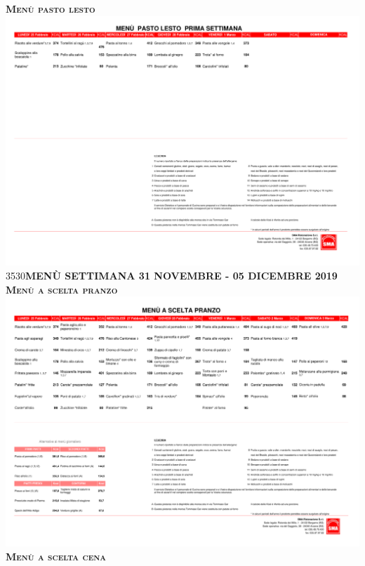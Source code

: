 \documentclass{article}
\makeatletter
\newcommand\HUGE{\@setfontsize\Huge{35}{30}}
\newcommand{\frasetre}{MENÙ SETTIMANA 31 NOVEMBRE - 05 DICEMBRE 2019}
\makeatother
\begin{document}
\begin{center}
\vspace{0.3cm}
{\Huge \textbf{\textsc{Menù pasto lesto}}}\\
\includegraphics[trim=0cm 23cm 0cm 2cm,clip,page=2,width=\textwidth,]{lesto.pdf}
\newpage
{\HUGE \color{red}\textbf{\frasetre}}\\
\vspace{0.7cm}
{\Huge \textbf{\textsc{Menù a scelta pranzo}}}\\
\includegraphics[trim=0cm 16cm 0cm 2cm,clip,page=5,width=\textwidth,]{scelta.pdf}
\vspace{0.3cm}
{\Huge \textbf{\textsc{Menù a scelta cena}}}\\

\end{center}
\end{document}
